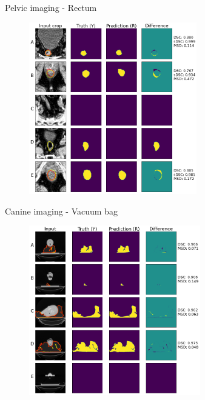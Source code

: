 \documentclass[9pt]{beamer}
\begin{document}
%
\begin{frame}{Pelvic imaging - Rectum}
  \begin{figure}
    \includegraphics[width=0.65\textwidth]{images/prostate_rectum}
  \end{figure}
\end{frame}
%
%   
%
\begin{frame}{Canine imaging - Vacuum bag}
\begin{figure}
\includegraphics[width=0.665\textwidth]{images/vet_vacbag}
\end{figure}
\end{frame}
\end{document}

